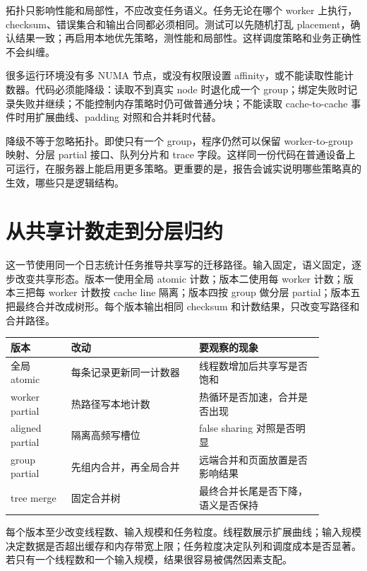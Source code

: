 拓扑只影响性能和局部性，不应改变任务语义。任务无论在哪个 worker 上执行，checksum、错误集合和输出合同都必须相同。测试可以先随机打乱 placement，确认结果一致；再启用本地优先策略，测性能和局部性。这样调度策略和业务正确性不会纠缠。

很多运行环境没有多 NUMA 节点，或没有权限设置 affinity，或不能读取性能计数器。代码必须能降级：读取不到真实 node 时退化成一个 group；绑定失败时记录失败并继续；不能控制内存策略时仍可做普通分块；不能读取 cache-to-cache 事件时用扩展曲线、padding 对照和合并耗时代替。

降级不等于忽略拓扑。即使只有一个 group，程序仍然可以保留 worker-to-group 映射、分层 partial 接口、队列分片和 trace 字段。这样同一份代码在普通设备上可运行，在服务器上能启用更多策略。更重要的是，报告会诚实说明哪些策略真的生效，哪些只是逻辑结构。

\section{从共享计数走到分层归约}

这一节使用同一个日志统计任务推导共享写的迁移路径。输入固定，语义固定，逐步改变共享形态。版本一使用全局 atomic 计数；版本二使用每 worker 计数；版本三把每 worker 计数按 cache line 隔离；版本四按 group 做分层 partial；版本五把最终合并改成树形。每个版本输出相同 checksum 和计数结果，只改变写路径和合并路径。

\begin{center}
\begin{tabular}{p{0.17\linewidth}p{0.36\linewidth}p{0.35\linewidth}}
\toprule
版本 & 改动 & 要观察的现象 \\
\midrule
全局 atomic & 每条记录更新同一计数器 & 线程数增加后共享写是否饱和 \\
worker partial & 热路径写本地计数 & 热循环是否加速，合并是否出现 \\
aligned partial & 隔离高频写槽位 & false sharing 对照是否明显 \\
group partial & 先组内合并，再全局合并 & 远端合并和页面放置是否影响结果 \\
tree merge & 固定合并树 & 最终合并长尾是否下降，语义是否保持 \\
\bottomrule
\end{tabular}
\end{center}

每个版本至少改变线程数、输入规模和任务粒度。线程数展示扩展曲线；输入规模决定数据是否超出缓存和内存带宽上限；任务粒度决定队列和调度成本是否显著。若只有一个线程数和一个输入规模，结果很容易被偶然因素支配。

